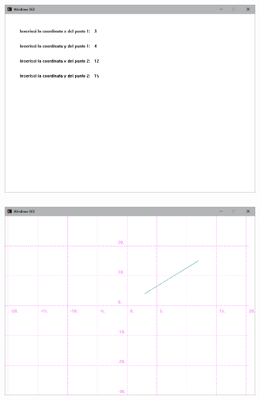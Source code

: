 \documentclass[12pt]{book}
\begin{document}
		\newpage
		\begin{figure}[h]
			\includegraphics[scale=0.5]{tracciasegmentoterminale1}
\\ \\ 
			\includegraphics[scale=0.5]{tracciasegmentoterminale2}
		\end{figure}
		\clearpage
		\newpage
\end{document}
